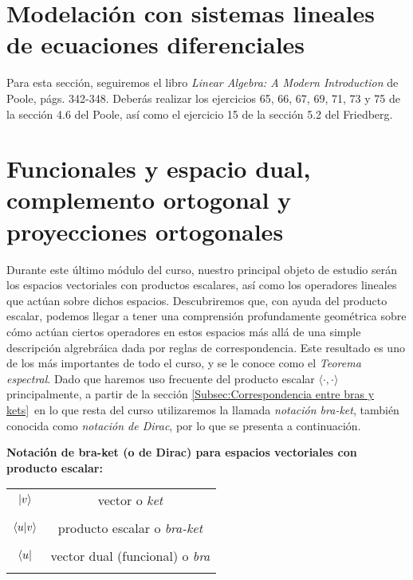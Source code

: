\documentclass[12pt,dvipsnames]{article}
\begin{document}
\newpage
\section{Modelación con sistemas lineales de ecuaciones diferenciales} \label{Sec:Modelación con sistemas lineales de ecuaciones diferenciales} 
Para esta sección, seguiremos el libro \emph{Linear Algebra: A Modern Introduction} de Poole, págs. 342-348. Deberás realizar los ejercicios 65, 66, 67, 69, 71, 73 y 75 de la sección 4.6 del Poole, así como el ejercicio 15 de la sección 5.2 del Friedberg.

\newpage

\section{Funcionales y espacio dual, complemento ortogonal y proyecciones ortogonales} \label{Sec:13} 

Durante este último módulo del curso, nuestro principal objeto de estudio serán los espacios vectoriales con productos escalares, así como los operadores lineales que actúan sobre dichos espacios. Descubriremos que, con ayuda del producto escalar, podemos llegar a tener una comprensión profundamente geométrica sobre cómo actúan ciertos operadores en estos espacios \textemdash más allá de una simple descripción algrebráica dada por reglas de correspondencia. Este resultado es uno de los más importantes de todo el curso, y se le conoce como el \emph{Teorema espectral}. Dado que haremos uso frecuente del producto escalar  $\langle\cdot ,\cdot\rangle$ \textemdash principalmente, a partir de la sección \ref{Subsec:Correspondencia entre bras y kets}\textemdash \ en lo que resta del curso utilizaremos la llamada \emph{notación bra-ket}, también conocida como \emph{notación de Dirac}, por lo que se presenta a continuación.

\vspace{3mm}

\textbf{Notación de bra-ket (o de Dirac) para espacios vectoriales con producto escalar:}
\begin{tcolorbox}
    \centering
    \begin{tabular}{cc}
        \\
        $\ket{v}$ & vector o \emph{ket}  \\ \\
        $\braket{u|v}$ & producto escalar o \emph{bra-ket}  \\ \\
        $\bra{u}$ & vector dual (funcional) o \emph{bra} \\ \\
    \end{tabular}
\end{tcolorbox}
\end{document}
